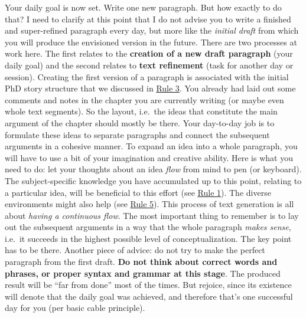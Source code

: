 \documentclass[
  12pt,
  oneside]{book}
\begin{document}
Your daily goal is now set.
Write one new paragraph.
But how exactly to do that?
I need to clarify at this point that I do not advise you to write a finished and super-refined paragraph every day, but more like the \emph{initial draft} from which you will produce the envisioned version in the future.
There are two processes at work here.
The first relates to the \textbf{creation of a new draft paragraph} (your daily goal) and the second relates to \textbf{text refinement} (task for another day or session).
Creating the first version of a paragraph is associated with the initial PhD story structure that we discussed in \protect\hyperlink{rule3}{Rule 3}.
You already had laid out some comments and notes in the chapter you are currently writing (or maybe even whole text segments).
So the layout, i.e.~the ideas that constitute the main argument of the chapter should mostly be there.
Your day-to-day job is to formulate these ideas to separate paragraphs and connect the subsequent arguments in a cohesive manner.
To expand an idea into a whole paragraph, you will have to use a bit of your imagination and creative ability.
Here is what you need to do: let your thoughts about an idea \emph{flow} from mind to pen (or keyboard).
The subject-specific knowledge you have accumulated up to this point, relating to a particular idea, will be beneficial to this effort (see \protect\hyperlink{rule1}{Rule 1}).
The diverse environments might also help (see \protect\hyperlink{rule5}{Rule 5}).
This process of text generation is all about \emph{having a continuous flow}.
The most important thing to remember is to lay out the subsequent arguments in a way that the whole paragraph \emph{makes sense}, i.e.~it succeeds in the highest possible level of conceptualization.
The key point has to be there.
Another piece of advice: do not try to make the perfect paragraph from the first draft.
\textbf{Do not think about correct words and phrases, or proper syntax and grammar at this stage}.
The produced result will be ``far from done'' most of the times.
But rejoice, since its existence will denote that the daily goal was achieved, and therefore that's one successful day for you (per basic cable principle).
\end{document}
